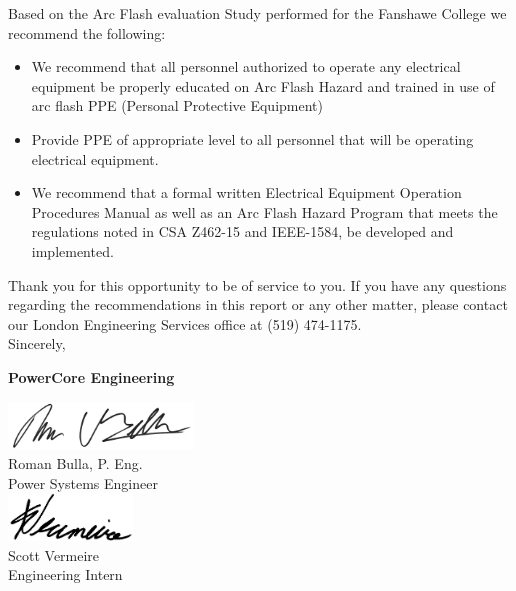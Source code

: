 Based on the Arc Flash evaluation Study performed for the Fanshawe College
we recommend the following:
\begin{itemize}
\item We recommend that all personnel authorized to operate any electrical equipment be properly educated on Arc Flash Hazard and trained  in use of arc flash PPE (Personal Protective Equipment)

\item	Provide PPE of appropriate level to all personnel that will be operating electrical equipment.

\item	We recommend that a formal written Electrical Equipment Operation Procedures Manual as well as an Arc Flash Hazard Program that meets the regulations noted in CSA Z462-15 and IEEE-1584, be developed and implemented.
\end{itemize}
\vspace{10mm}
\noindent Thank you for this opportunity to be of service to you.  If you have any questions regarding the recommendations in this report or any other matter, please contact our London Engineering Services office at (519) 474-1175. \newline
\vspace{5mm}
\\
\noindent Sincerely,\newline

\vspace{5mm}
\noindent\textbf{PowerCore Engineering}\newline


\begin{multicols}{2}
\centering
\includegraphics[height=0.5in, keepaspectratio=true]{Images/Roman_signature.jpg} \\
Roman Bulla, P. Eng. \\Power Systems Engineer \\
\includegraphics[height=0.5in, keepaspectratio=true]{Images/Scott_signature.jpg} \\
Scott Vermeire \\Engineering Intern \\
\end{multicols}